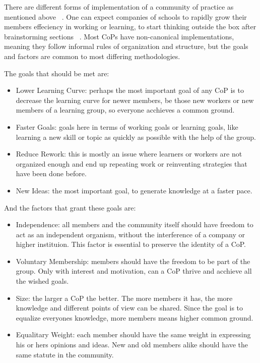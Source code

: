 There are different forms of implementation of a community of practice as mentioned
above ~\cite{buildingcopthatwork}.
One can expect companies of schools to rapidly grow their members 
effeciency in working or learning, to start thinking outside the box after 
brainstorming sections ~\cite{thinkingtogether}.
Most CoPs have non-canonical implementations, meaning they follow informal rules 
of organization and structure, but the goals and factors are common to most 
differing methodologies.

The goals that should be met are:
\begin{itemize}
    \item Lower Learning Curve: perhaps the most important goal of any CoP is to
        decrease the learning curve for newer members, be those new workers or 
        new members of a learning group, so everyone acchieves a common ground.
    \item Faster Goals: goals here in terms of working goals or learning goals, 
        like learning a new skill or topic as quickly as possible with the help 
        of the group.
    \item Reduce Rework: this is mostly an issue where learners or workers are not
        organized enough and end up repeating work or reinventing strategies that
        have been done before.
    \item New Ideas: the most important goal, to generate knowledge at a faster pace.
\end{itemize}


And the factors that grant these goals are:
\begin{itemize}
    \item Independence: all members and the community itself should have freedom to
        act as an independent organism, without the interference of a company or  
        higher instituion. This factor is essential to preserve the identity of a CoP.
    \item Voluntary Membership: members should have the freedom to be part of the 
        group. Only with interest and motivation, can a CoP thrive and acchieve all
        the wished goals.
    \item Size: the larger a CoP the better. The more members it has, the more 
        knowledge and different points of view can be shared. Since the goal is to
        equalize everyones knowledge, more members means higher common ground.
    \item Equalitary Weight: each member should have the same weight in expressing
        his or hers opinions and ideas. New and old members alike should have the 
        same statute in the community.
\end{itemize}



